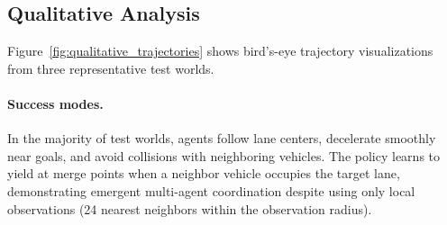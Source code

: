 %
%
%

\subsection{Qualitative Analysis}
\label{sec:qualitative}


Figure~\ref{fig:qualitative_trajectories} shows bird's-eye trajectory visualizations from three representative test worlds.

\paragraph{Success modes.}
In the majority of test worlds, agents follow lane centers, decelerate smoothly near goals, and avoid collisions with neighboring vehicles.
The policy learns to yield at merge points when a neighbor vehicle occupies the target lane, demonstrating emergent multi-agent coordination despite using only local observations (24 nearest neighbors within the observation radius).

